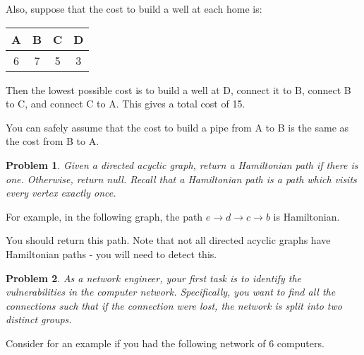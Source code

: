 \documentclass{article}
\newtheorem{problem}{Problem}
\begin{document}
Also, suppose that the cost to build a well at each home is:
\begin{center}
\begin{tabular}{|cccc|}
\hline
A & B & C & D \\
\hline
6 & 7 & 5 & 3 \\
\hline
\end{tabular}
\end{center}

Then the lowest possible cost is to build a well at D, connect it to B, connect B to C, and connect C to A.  This gives a total cost of 15.

You can safely assume that the cost to build a pipe from A to B is the same as the cost from B to A.

\begin{problem}
Given a directed acyclic graph, return a Hamiltonian path if there is one.  Otherwise, return null.  Recall that a Hamiltonian path is a path which visits every vertex exactly once.
\end{problem}

For example, in the following graph, the path $e \rightarrow d \rightarrow c \rightarrow b$ is Hamiltonian.
\begin{center}
\end{center}
You should return this path.  Note that not all directed acyclic graphs have Hamiltonian paths - you will need to detect this.

\begin{problem}
As a network engineer, your first task is to identify the vulnerabilities in the computer network.  Specifically, you want to find all the connections such that if the connection were lost, the network is split into two distinct groups.
\end{problem}

Consider for an example if you had the following network of 6 computers.

\begin{center}
\end{center}
\end{document}
